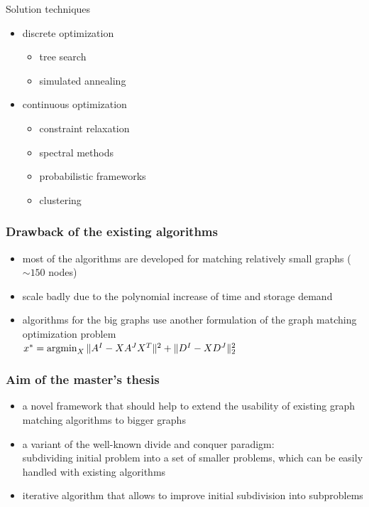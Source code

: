 \documentclass[hyperref={pdfpagelabels=false}]{beamer}
\def\argmin{\mathop{\rm argmin}}						%
\begin{document}
\begin{frame} [allowframebreaks]
Solution techniques~{\tiny\citep{Conte2004}}
\begin{itemize}
\item discrete optimization
	\begin{itemize}
	\item tree search~{\tiny\citep{Bunke1983_inexactGM,Shapiro1981,Fu1979,Wang1995}}
	\item simulated annealing~{\tiny\citep{Herault1990_SimulatedAnnealing}}
	\end{itemize} 
\item continuous optimization
	\begin{itemize}
		\item constraint relaxation~{\tiny\citep{Rangarajan1996_GAGM,Leordeanu2009_IPFP,FastPFP,Vogelstein_BrainGraphs,Zazlavskiy2008_PATH}}
		\item spectral methods~{\tiny\citep{Leordeanu2005_SM,Umeyam1988}}
		\item probabilistic frameworks~{\tiny\citep{Armiti2014,Hancock_Kittler,Hancock_EM_SVD,Sanrom2012}}
		\item clustering~{\tiny\citep{Hancock_ModalClusters,Cho2009_AgglClustering,Hancock_GM_SpectralPart,Lyzinski2015}}
	\end{itemize} 
\end{itemize}
\end{frame}
\begin{frame}
\frametitle{Drawback of the existing algorithms}

\begin{itemize}
\item most of the algorithms are developed for matching relatively small graphs ($\sim 150$ nodes)
\item scale badly due to the polynomial increase of time and storage demand
\item algorithms for the big graphs use another formulation of the graph matching optimization problem\\
\vspace{5pt}
{\centering
$x^* = \argmin_{X}\|A^I-XA^JX^T\|^2+\|D^I-XD^J\|^2_2$}
\end{itemize}

\end{frame}
\begin{frame}
\frametitle{Aim of the master's thesis}
\begin{itemize}
\item a novel framework that should help to extend the usability
of existing graph matching algorithms to bigger graphs
\item a variant of the well-known divide and conquer paradigm:\\
	subdividing initial problem into a set of smaller problems, which can be easily handled with existing algorithms
\item iterative algorithm that allows to improve initial subdivision into subproblems
\end{itemize}

\end{frame}
\end{document}
